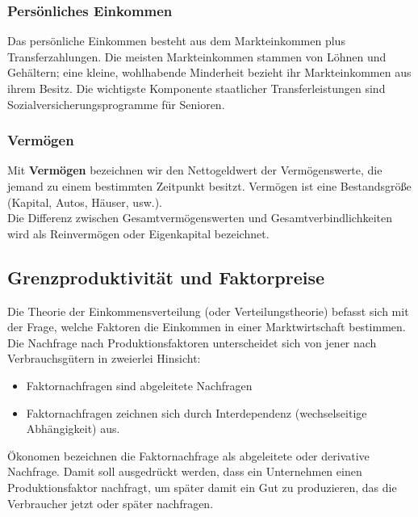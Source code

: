 \documentclass[10pt]{scrartcl}
\begin{document}
\subsubsection{Persönliches Einkommen}
Das persönliche Einkommen besteht aus dem Markteinkommen plus Transferzahlungen. Die meisten Markteinkommen stammen von Löhnen und Gehältern; eine kleine, wohlhabende Minderheit bezieht ihr Markteinkommen aus ihrem Besitz. Die wichtigste Komponente staatlicher Transferleistungen sind Sozialversicherungsprogramme für Senioren. 
\subsubsection{Vermögen}
Mit {\bf Vermögen } bezeichnen wir den Nettogeldwert der Vermögenswerte, die jemand zu einem bestimmten Zeitpunkt besitzt. Vermögen ist eine Bestandsgröße (Kapital, Autos, Häuser, usw.).\\
Die Differenz zwischen Gesamtvermögenswerten und Gesamtverbindlichkeiten wird als Reinvermögen oder Eigenkapital bezeichnet.
\subsection{Grenzproduktivität und Faktorpreise}
Die Theorie der Einkommensverteilung (oder Verteilungstheorie) befasst sich mit der Frage, welche Faktoren die Einkommen in einer Marktwirtschaft bestimmen.\\
Die Nachfrage nach Produktionsfaktoren unterscheidet sich von jener nach Verbrauchsgütern in zweierlei Hinsicht: 
\begin{itemize}
\item Faktornachfragen sind abgeleitete Nachfragen 
\item Faktornachfragen zeichnen sich durch Interdependenz (wechselseitige Abhängigkeit) aus.
\end{itemize} 
Ökonomen bezeichnen die Faktornachfrage als abgeleitete oder derivative Nachfrage. Damit soll ausgedrückt werden, dass ein Unternehmen einen Produktionsfaktor nachfragt, um später damit ein Gut zu  produzieren, das die Verbraucher jetzt oder später nachfragen.
\end{document}
